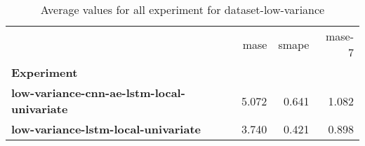 \begin{table}[h]
\centering
\caption{Average values for all experiment for dataset-low-variance}
\label{table:Average-metric-dataset-low-variance}
\begin{tabular}{lrrr}
\toprule
{} &   mase &  smape &  mase-7 \\
\textbf{Experiment                               } &        &        &         \\
\midrule
\textbf{low-variance-cnn-ae-lstm-local-univariate} &  5.072 &  0.641 &   1.082 \\
\textbf{low-variance-lstm-local-univariate       } &  3.740 &  0.421 &   0.898 \\
\bottomrule
\end{tabular}
\end{table}

